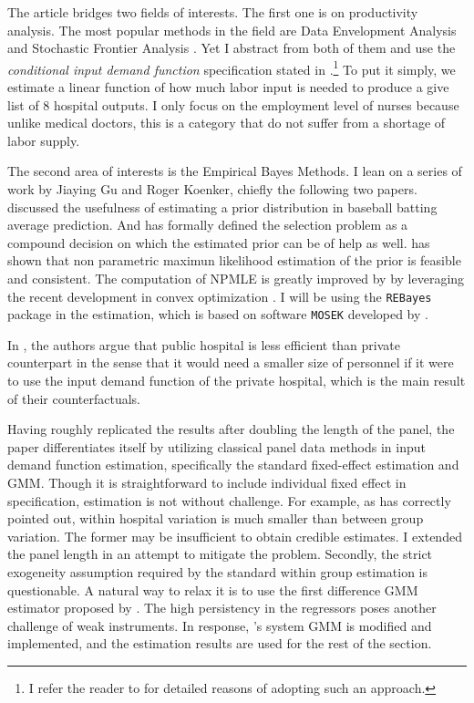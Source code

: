 \documentclass[12pt]{article}
\begin{document}
The article bridges two fields of interests. The first one is on productivity
analysis. The most popular methods in the field are Data Envelopment Analysis
\citep{charnes1978measuring} and Stochastic Frontier Analysis
\citep{aigner1977formulation,meeusen1977efficiency}. Yet I abstract from both
of them and use the \textit{conditional input demand function} specification
stated in \cite{croiset2024hospitals}.\footnote{I refer the reader to
    \citet{croiset2024hospitals} for detailed reasons of adopting such an
    approach.} To put it simply, we estimate a linear function of how much labor
input is needed to produce a give list of 8 hospital outputs. I only focus on
the employment level of nurses because unlike medical doctors, this is a
category that do not suffer from a shortage of labor supply.

The second area of interests is the Empirical Bayes Methods. I lean on a series
of work by Jiaying Gu and Roger Koenker, chiefly the following two papers.
\citet{gu2017empirical} discussed the usefulness of estimating a prior
distribution in baseball batting average prediction. And
\citet{gu2023invidious} has formally defined the selection problem as a
compound decision on which the estimated prior can be of help as well.
\citet{kiefer1956consistency} has shown that non parametric maximun likelihood
estimation of the prior is feasible and consistent. The computation of NPMLE is
greatly improved by \citet{koenker2014convex} by leveraging the recent
development in convex optimization \citep{andersen2010mosek}. I will be using
the \verb+REBayes+ package \citep{koenker2017rebayes} in the estimation, which
is based on software \verb+MOSEK+ developed by \citet{andersen2010mosek}.

In \cite{croiset2024hospitals}, the authors argue that public hospital is less
efficient than private counterpart in the sense that it would need a smaller
size of personnel if it were to use the input demand function of the private
hospital, which is the main result of their counterfactuals.

Having roughly replicated the results after doubling the length of the panel,
the paper differentiates itself by utilizing classical panel data methods in
input demand function estimation, specifically the standard fixed-effect
estimation and GMM. Though it is straightforward to include individual fixed
effect in specification, estimation is not without challenge. For example, as
\citet{croiset2024hospitals} has correctly pointed out, within hospital
variation is much smaller than between group variation. The former may be
insufficient to obtain credible estimates. I extended the panel length in an
attempt to mitigate the problem. Secondly, the strict exogeneity assumption
required by the standard within group estimation is questionable. A natural way
to relax it is to use the first difference GMM estimator proposed by
\citet{arellano1991some}. The high persistency in the regressors poses another
challenge of weak instruments. In response,
\citet{arellano1995another,blundell1998initial}'s system GMM is modified and
implemented, and the estimation results are used for the rest of the section.
\end{document}
